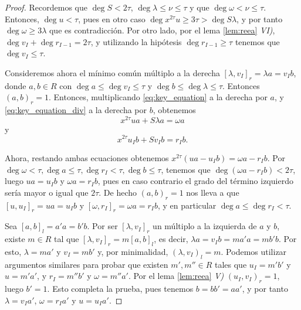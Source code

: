 \begin{proof}
    Recordemos que \(\deg S < 2\tau\), \(\deg \lambda \le \nu \le \tau\) y que \(\deg \omega < \nu \le \tau\). Entonces, \(\deg u < \tau\), pues en otro caso \(\deg x^{2\tau}u \ge 3\tau > \deg S\lambda\), y por tanto \(\deg \omega \ge 3\lambda\) que es contradicción. Por otro lado, por el lema \ref{lem:reea} \textit{VI)}, \(\deg v_{I} + \deg r_{I-1} = 2\tau\), y utilizando la hipótesis \(\deg r_{I-1} \ge \tau\) tenemos que \(\deg v_{I} \le \tau\).

    Consideremos ahora el mínimo común múltiplo a la derecha \({[\lambda, v_{I}]}_{r} = \lambda a = v_{I}b\), donde \(a, b \in R\) con \(\deg a \le \deg v_{I} \le \tau\) y \(\deg b \le \deg \lambda \le \tau\). Entonces  \({(a,b)}_{r} = 1\). Entonces, multiplicando \ref{eq:key_equation} a la derecha por \(a\), y \ref{eq:key_equation_div} a la derecha por \(b\), obtenemos
    \begin{equation}
        x^{2\tau} u a + S \lambda a = \omega a
    \end{equation}
y
    \begin{equation}
        x^{2\tau}u_{I}b + Sv_{I}b = r_{I}b.
    \end{equation}

    Ahora, restando ambas ecuaciones obtenemos \(x^{2\tau}(ua - u_{I}b) = \omega a - r_{I}b\). Por \(\deg \omega < \tau, \deg a \le \tau, \deg r_{I} < \tau, \deg{b} \le \tau\), tenemos que \(\deg (\omega a - r_{I}b) < 2\tau\), luego \(ua = u_{I}b\) y \(\omega a = r_{I}b\), pues en caso contrario el grado del término izquierdo sería mayor o igual que \(2\tau\). De hecho \({(a,b)}_{r} = 1\) nos lleva a que \({[u, u_{I}]}_r = ua = u_{I}b\) y \({[\omega, r_{I}]}_r = \omega a = r_{I}b\), y en particular \(\deg a \le \deg r_{I} < \tau\).

    Sea \({[a,b]}_l = a'a = b'b\). Por ser \([\lambda, v_{I}]_r\) un múltiplo a la izquierda de \(a\) y \(b\), existe \(m \in R\) tal que \({[\lambda, v_{I}]}_{r} = m{[a,b]}_{l}\), es decir, \(\lambda a = v_{I}b = ma'a = mb'b\). Por esto, \(\lambda = ma'\) y \(v_{I} = mb'\) y, por minimalidad, \({(\lambda, v_{I})}_l = m\). Podemos utilizar argumentos similares para probar que existen \(m', m'' \in R\) tales que \(u_{I} = m'b'\) y  \(u = m'a'\), y  \(r_{I} = m''b'\) y \(\omega = m''a'\). Por el lema \ref{lem:reea} \textit{V)} \({(u_{I}, v_{I})} _r = 1\), luego \(b' = 1\). Esto completa la prueba, pues tenemos \(b = b b' = a a'\), y por tanto  \(\lambda = v_{I}a'\), \(\omega = r_{I}a'\) y \(u = u_{I}a'\).
\end{proof}

